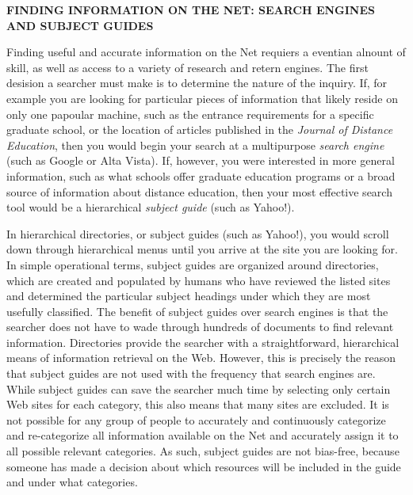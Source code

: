 \documentclass{article}
\begin{document}
{\large\textbf{FINDING INFORMATION ON THE NET: SEARCH ENGINES AND SUBJECT GUIDES}}
\vspace{0.5cm}

Finding useful and accurate information on the Net requiers a eventian alnount of skill, as well as access to a variety of research and retern engines. The first desision a searcher must make is to determine the nature of the inquiry. If, for example you are looking for particular pieces of information that likely reside on only one papoular 
machine, such as the entrance requirements for a specific graduate school, or the location of articles published in the \textit{Journal of Distance Education}, then you would begin your search at a multipurpose \textit{search engine} (such as Google or Alta Vista). If, however, you were interested in more general information, such as what schools offer graduate education programs or a broad source of information about distance education, then your most effective search tool would be a hierarchical \textit{subject guide} (such as Yahoo!).

In hierarchical directories, or subject guides (such as Yahoo!), you would scroll down through hierarchical menus until you arrive at the site you are looking for. In simple operational terms, subject guides are organized around directories, which are created and populated by humans who have reviewed the listed sites and determined the particular subject headings under which they are most usefully classified. The benefit of subject guides over search engines is that the searcher does not have to wade through hundreds of documents to find relevant information. Directories provide the searcher with a straightforward, hierarchical means of information retrieval on the Web. However, this is precisely the reason that subject guides are not used with the frequency that search engines are. While subject guides can save the searcher much time by selecting only certain Web sites for each category, this also means that many sites are excluded. It is not possible for any group of people to accurately and continuously categorize and re-categorize all information available on the Net and accurately assign it to all possible relevant categories. As such, subject guides are not bias-free, because someone has made a decision about which resources will be included in the guide and under what categories.
\end{document}
